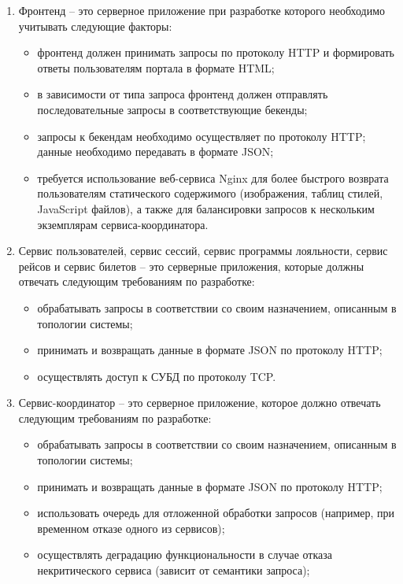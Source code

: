 \begin{enumerate}
    \item Фронтенд -- это серверное приложение при разработке которого необходимо учитывать следующие факторы:
    \begin{itemize}
        \item фронтенд должен принимать запросы по протоколу HTTP и формировать ответы пользователям портала в формате HTML;
        \item в зависимости от типа запроса фронтенд должен отправлять последовательные запросы в соответствующие бекенды;
        \item запросы к бекендам необходимо осуществляет по протоколу HTTP; данные необходимо передавать в формате JSON;
        \item требуется использование веб-сервиса Nginx для более быстрого возврата пользователям статического содержимого (изображения, таблиц стилей, JavaScript файлов), а также для балансировки запросов к нескольким экземплярам сервиса-координатора.
    \end{itemize}
    \item Сервис пользователей, сервис сессий, сервис программы лояльности, сервис рейсов и сервис билетов -- это серверные приложения, которые должны отвечать следующим требованиям по разработке:
    \begin{itemize}
        \item обрабатывать запросы в соответствии со своим назначением, описанным в топологии системы;
        \item принимать и возвращать данные в формате JSON по протоколу HTTP;
        \item осуществлять доступ к СУБД по протоколу TCP.
    \end{itemize}
    \item Сервис-координатор -- это серверное приложение, которое должно отвечать следующим требованиям по разработке:
    \begin{itemize}
        \item обрабатывать запросы в соответствии со своим назначением, описанным в топологии системы;
        \item принимать и возвращать данные в формате JSON по протоколу HTTP;
        \item использовать очередь для отложенной обработки запросов (например, при временном отказе одного из сервисов);
        \item осуществлять деградацию функциональности в случае отказа некритического сервиса (зависит от семантики запроса);

\end{itemize}
\end{enumerate}
